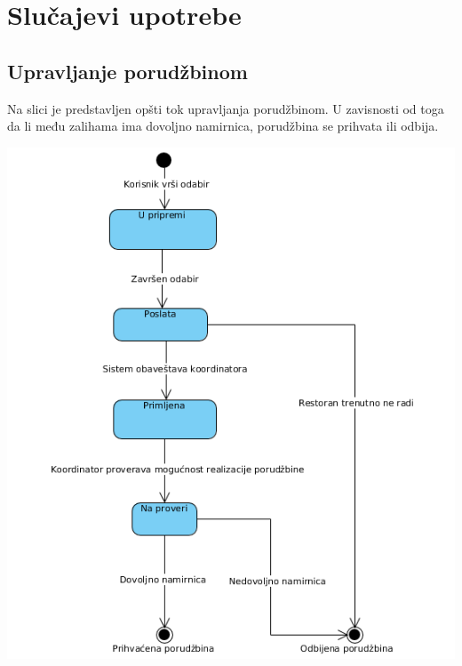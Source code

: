 \section{Slučajevi upotrebe}
\subsection{Upravljanje porudžbinom}
Na slici je predstavljen opšti tok upravljanja porudžbinom. U zavisnosti od toga da li među zalihama ima dovoljno namirnica, porudžbina se prihvata ili odbija.

\includegraphics[width=136mm]{slike/Upravljanje_porudzbinom.png}\\


